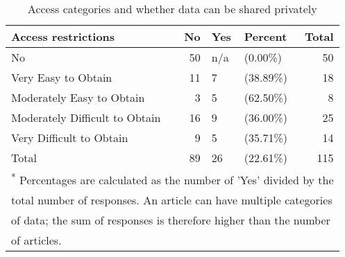 \begin{table}[!h]
\centering
\caption{Access categories and whether data can be shared privately}
\centering
\begin{tabular}[t]{lrllr}
\toprule
Access restrictions & No & Yes & Percent & Total\\
\midrule
No & 50 & n/a & (0.00\%) & 50\\
Very Easy to Obtain & 11 & 7 & (38.89\%) & 18\\
Moderately Easy to Obtain & 3 & 5 & (62.50\%) & 8\\
Moderately Difficult to Obtain & 16 & 9 & (36.00\%) & 25\\
Very Difficult to Obtain & 9 & 5 & (35.71\%) & 14\\
\addlinespace
Total & 89 & 26 & (22.61\%) & 115\\
\bottomrule
\multicolumn{5}{l}{\textsuperscript{*} Percentages are calculated as the number of 'Yes' divided by the}\\
\multicolumn{5}{l}{total number of responses. An article can have multiple categories}\\
\multicolumn{5}{l}{of data; the sum of responses is therefore higher than the number}\\
\multicolumn{5}{l}{of articles.}\\
\end{tabular}
\end{table}
